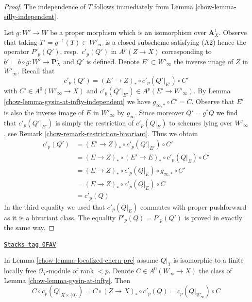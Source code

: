 \begin{proof}

The independence of $T$ follows immediately from
Lemma \ref{chow-lemma-silly-independent}.

\medskip\noindent
Let $g : W' \to W$ be a proper morphism which is an isomorphism over
$\mathbf{A}^1_X$. Observe that taking $T' = g^{-1}(T) \subset W'_\infty$
is a closed subscheme satisfying (A2) hence the operator
$P'_p(Q')$, resp.\ $c'_p(Q')$ in $A^p(Z \to X)$
corresponding to $b' = b \circ g : W' \to \mathbf{P}^1_X$
and $Q'$ is defined. Denote $E' \subset W'_\infty$
the inverse image of $Z$ in $W'_\infty$. Recall that
$$
c'_p(Q') = (E' \to Z)_* \circ c'_p(Q'|_{E'}) \circ C'
$$
with $C' \in A^0(W'_\infty \to X)$ and
$c'_p(Q'|_{E'}) \in A^p(E' \to W'_\infty)$.
By Lemma \ref{chow-lemma-gysin-at-infty-independent} we have
$g_{\infty, *} \circ C' = C$. Observe that $E'$ is also
the inverse image of $E$ in $W'_\infty$ by $g_\infty$.
Since moreover $Q' = g^*Q$ we find that $c'_p(Q'|_{E'})$ is simply the
restriction of $c'_p(Q|_E)$ to schemes lying over $W'_\infty$, see
Remark \ref{chow-remark-restriction-bivariant}. Thus we obtain
\begin{align*}
c'_p(Q')
& =
(E' \to Z)_* \circ c'_p(Q'|_{E'}) \circ C' \\
& =
(E \to Z)_* \circ (E' \to E)_* \circ c'_p(Q|_E) \circ C' \\
& =
(E \to Z)_* \circ c'_p(Q|_E) \circ g_{\infty, *} \circ C' \\
& =
(E \to Z)_* \circ c'_p(Q|_E) \circ C \\
& =
c'_p(Q)
\end{align*}
In the third equality we used that $c'_p(Q|_E)$
commutes with proper pushforward as it is a
bivariant class. The equality $P'_p(Q) = P'_p(Q')$
is proved in exactly the same way.
\end{proof}

\begin{lemma}[Homomorphism]
\label{chow-lemma-homomorphism}
\href{https://stacks.math.columbia.edu/tag/0FAV}{\texttt{Stacks tag 0FAV}}

In Lemma \ref{chow-lemma-localized-chern-pre} assume $Q|_T$ is isomorphic
to a finite locally free $\mathcal{O}_T$-module of rank $< p$.
Denote $C \in A^0(W_\infty \to X)$ the class of
Lemma \ref{chow-lemma-gysin-at-infty}. Then
$$
C \circ c_p(Q|_{X \times \{0\}}) =
C \circ (Z \to X)_* \circ c'_p(Q) = c_p(Q|_{W_\infty}) \circ C
$$
\end{lemma}

